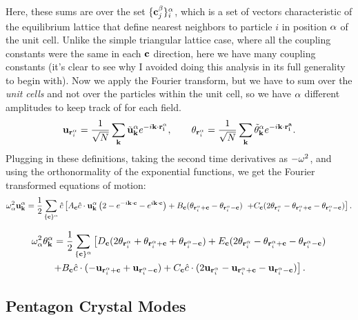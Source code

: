 \documentclass[12pt]{article}
\begin{document}
Here, these sums are over the set $\{\mathbf{c}_j^\beta \}_i^\alpha$, which is a set of 
vectors characteristic of the equilibrium lattice that define nearest 
neighbors to particle $i$ in position $\alpha$ of the unit cell. Unlike the simple 
triangular lattice case, where all the coupling constants were the same in each 
$\mathbf{c}$ direction, here we have many coupling constants (it's clear to see why 
I avoided doing this analysis in its full generality to begin with). Now we 
apply the Fourier transform, but we have to sum over the \emph{unit cells} and 
not over the particles within the unit cell, so we have $\alpha$ different 
amplitudes to keep track of for each field.
\[ \mathbf{u}_{\mathbf{r}_i^\alpha} = \frac{1}{\sqrt{N}} \sum_{\mathbf{k}} \tilde{\mathbf{u}}_{\mathbf{k}}^\alpha 
e^{-i \mathbf{k}\cdot\mathbf{\mathbf{r}_i^\alpha} }, \qquad \mathbf{\theta}_{\mathbf{r}_i^\alpha} = \frac{1}{\sqrt N} \sum_{\mathbf{k}} \tilde{\theta}_{\mathbf{k}}^\alpha e^{-i\mathbf{k}\cdot\mathbf{\mathbf{r}_i^a} }.\]
Plugging in these definitions, taking the second time derivatives as $-\omega^2$, 
and using the orthonormality of the exponential functions, we get the Fourier 
transformed equations of motion:
\[ \omega^2_\alpha {\mathbf{u}}^\alpha_{\mathbf{k}} = \frac{1}{2} \sum_{\{\mathbf{c}\}^\alpha} \hat c  \left [   A_{\mathbf{c}} \hat c \cdot \mathbf{u}_{\mathbf{k}}^\alpha 
\left( 2 - e^{-i\mathbf{k}\cdot\mathbf{c}} - e^{i\mathbf{k}\cdot\mathbf{c}} \right)  + 
B_{\mathbf{c}}(\theta_{\mathbf{r}_i^\alpha + \mathbf{c}} - \theta_{\mathbf{r}_i^\alpha - \mathbf{c}}) 
\right. \\ \left.+ C_{\mathbf{c}} (2\theta_{\mathbf{r}_i^\alpha} - \theta_{\mathbf{r}_i^\alpha +\mathbf{c}} 
- \theta_{\mathbf{r}_i^\alpha - \mathbf{c}})   \right].\]

\begin{multline*}   \omega_\alpha^2 \theta^\alpha_{\mathbf{k}} = \frac{1}{2} \sum_{\{\mathbf{c}\}^\alpha} 
\left [ D_{\mathbf{c}} (2\theta_{\mathbf{r}_i^\alpha} + \theta_{\mathbf{r}_i^\alpha + \mathbf{c}} + 
\theta_{\mathbf{r}_i^\alpha - \mathbf{c}}) + E_{\mathbf{c}}(2\theta_{\mathbf{r}_i^\alpha} - \theta_{\mathbf{r}_i^\alpha + 
\mathbf{c}} - \theta_{\mathbf{r}_i^\alpha - \mathbf{c}}) \right. \\ \left. + B_{\mathbf{c}} 
\hat c \cdot (- \mathbf{u}_{\mathbf{r}_i^\alpha + \mathbf{c}} + \mathbf{u}_{\mathbf{r}_i^\alpha - \mathbf{c}}) + C_{\mathbf{c}} \hat c \cdot (2\mathbf{u}_{\mathbf{r}_i^\alpha} - \mathbf{u}_{\mathbf{r}_i^\alpha 
+ \mathbf{c}} - \mathbf{u}_{\mathbf{r}_i^\alpha - \mathbf{c}}) \right ]. \end{multline*}

\subsection{Pentagon Crystal Modes}





\end{document}
